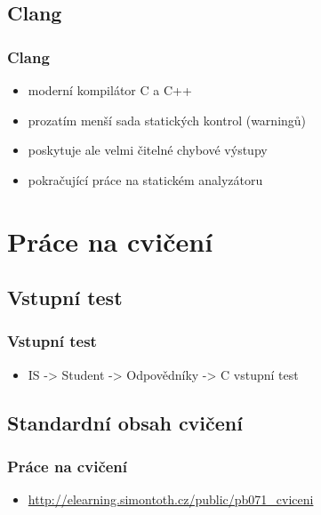 \subsection{Clang}

\begin{frame}
	\frametitle{Clang}
	\begin{itemize}
		\item{moderní kompilátor C a C++}
		\item{prozatím menší sada statických kontrol (warningů)}
		\item{poskytuje ale velmi čitelné chybové výstupy}
		\item{pokračující práce na statickém analyzátoru}
	\end{itemize}
\end{frame}

\section{Práce na cvičení}
\subsection{Vstupní test}

\begin{frame}
	\frametitle{Vstupní test}
	\begin{itemize}
		\item{IS -> Student -> Odpovědníky -> C vstupní test}
	\end{itemize}
\end{frame}

\subsection{Standardní obsah cvičení}

\begin{frame}
	\frametitle{Práce na cvičení}
	\begin{itemize}
		\item{\href{http://elearning.simontoth.cz/public/pb071\_cviceni}{http://elearning.simontoth.cz/public/pb071\_cviceni}}
	\end{itemize}
\end{frame}




